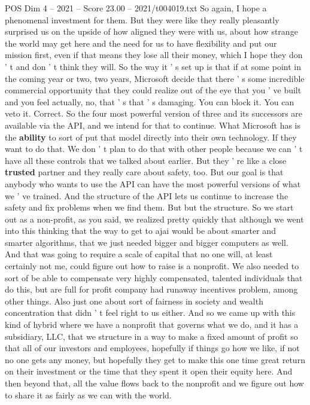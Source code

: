 \begin{textsample}{POS Dim 4 – 2021 – Score 23.00 – 2021/t004019.txt}
So again, I hope a phenomenal investment for them.
But they were like they really pleasantly surprised us on the upside of how aligned they were with us, about how strange the world may get here and the need for us to have flexibility and put our mission first, even if that means they lose all their money, which I hope they don ' t and don ' t think they will.
So the way it ' s set up is that if at some point in the coming year or two, two years, Microsoft decide that there ' s some incredible commercial opportunity that they could realize out of the eye that you ' ve built and you feel actually, no, that ' s that ' s damaging.
You can block it.
You can veto it.
Correct.
So the four most powerful version of three and its successors are available via the API, and we intend for that to continue.
What Microsoft has is the \textbf{ability} to sort of put that model directly into their own technology.
If they want to do that.
We don ' t plan to do that with other people because we can ' t have all these controls that we talked about earlier.
But they ' re like a close \textbf{trusted} partner and they really care about safety, too.
But our goal is that anybody who wants to use the API can have the most powerful versions of what we ' ve trained.
And the structure of the API lets us continue to increase the safety and fix problems when we find them.
But but the structure.
So we start out as a non-profit, as you said, we realized pretty quickly that although we went into this thinking that the way to get to ajai would be about smarter and smarter algorithms, that we just needed bigger and bigger computers as well.
And that was going to require a scale of capital that no one will, at least certainly not me, could figure out how to raise is a nonprofit.
We also needed to sort of be able to compensate very highly compensated, talented individuals that do this, but are full for profit company had runaway incentives problem, among other things.
Also just one about sort of fairness in society and wealth concentration that didn ' t feel right to us either.
And so we came up with this kind of hybrid where we have a nonprofit that governs what we do, and it has a subsidiary, LLC, that we structure in a way to make a fixed amount of profit so that all of our investors and employees, hopefully if things go how we like, if not no one gets any money, but hopefully they get to make this one time great return on their investment or the time that they spent it open their equity here.
And then beyond that, all the value flows back to the nonprofit and we figure out how to share it as fairly as we can with the world.

\end{textsample}
